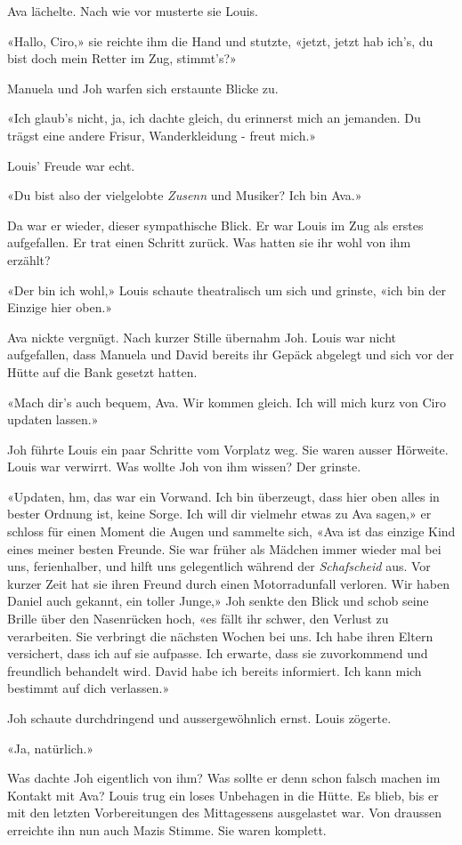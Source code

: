 Ava lächelte. Nach wie vor musterte sie Louis.

«Hallo, Ciro,» sie reichte ihm die Hand und stutzte, «jetzt, jetzt hab
ich’s, du bist doch mein Retter im Zug, stimmt’s?»

Manuela und Joh warfen sich erstaunte Blicke zu.

«Ich glaub’s nicht, ja, ich dachte gleich, du erinnerst mich an
jemanden. Du trägst eine andere Frisur, Wanderkleidung - freut mich.»

Louis’ Freude war echt.

«Du bist also der vielgelobte \emph{Zusenn} und Musiker? Ich bin Ava.»

Da war er wieder, dieser sympathische Blick. Er war Louis im Zug als
erstes aufgefallen. Er trat einen Schritt zurück. Was hatten sie ihr
wohl von ihm erzählt?

«Der bin ich wohl,» Louis schaute theatralisch um sich und grinste, «ich
bin der Einzige hier oben.»

Ava nickte vergnügt. Nach kurzer Stille übernahm Joh. Louis war nicht
aufgefallen, dass Manuela und David bereits ihr Gepäck abgelegt und sich
vor der Hütte auf die Bank gesetzt hatten.

«Mach dir’s auch bequem, Ava. Wir kommen gleich. Ich will mich kurz von
Ciro updaten lassen.»

Joh führte Louis ein paar Schritte vom Vorplatz weg. Sie
waren ausser Hörweite. Louis war verwirrt. Was wollte Joh von ihm
wissen? Der grinste.

«Updaten, hm, das war ein Vorwand. Ich bin überzeugt, dass hier oben
alles in bester Ordnung ist, keine Sorge. Ich will dir vielmehr etwas zu
Ava sagen,» er schloss für einen Moment die Augen und sammelte sich,
«Ava ist das einzige Kind eines meiner besten Freunde. Sie war früher
als Mädchen immer wieder mal bei uns, ferienhalber, und hilft uns
gelegentlich während der \emph{Schafscheid} aus. Vor kurzer Zeit hat sie
ihren Freund durch einen Motorradunfall verloren. Wir haben Daniel auch
gekannt, ein toller Junge,» Joh senkte den Blick und schob seine Brille
über den Nasenrücken hoch, «es fällt ihr schwer, den
Verlust zu verarbeiten. Sie verbringt die nächsten Wochen bei uns. Ich habe ihren Eltern versichert, dass ich auf
sie aufpasse. Ich erwarte, dass sie zuvorkommend und freundlich
behandelt wird. David habe ich bereits informiert. Ich kann mich
bestimmt auf dich verlassen.»

Joh schaute durchdringend und aussergewöhnlich ernst. Louis zögerte.

«Ja, natürlich.»

Was dachte Joh eigentlich von ihm? Was sollte er denn schon falsch
machen im Kontakt mit Ava? Louis trug ein loses Unbehagen in die Hütte. Es blieb, bis er mit den
letzten Vorbereitungen des Mittagessens ausgelastet war. Von draussen
erreichte ihn nun auch Mazis Stimme. Sie waren komplett.
